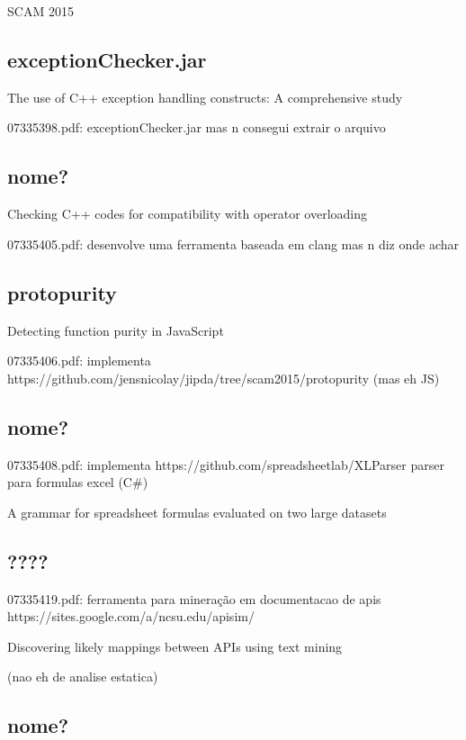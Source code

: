 SCAM 2015

\subsection{exceptionChecker.jar}

The use of C++ exception handling constructs: A comprehensive study

07335398.pdf: exceptionChecker.jar mas n consegui extrair o arquivo

\subsection{nome?}

Checking C++ codes for compatibility with operator overloading

07335405.pdf: desenvolve uma ferramenta baseada em clang mas n diz onde achar

\subsection{protopurity}

Detecting function purity in JavaScript

07335406.pdf: implementa https://github.com/jensnicolay/jipda/tree/scam2015/protopurity (mas eh JS)

\subsection{nome?}

07335408.pdf: implementa https://github.com/spreadsheetlab/XLParser parser para formulas excel (C\#)

A grammar for spreadsheet formulas evaluated on two large datasets

\subsection{????}

07335419.pdf: ferramenta para mineração em documentacao de apis https://sites.google.com/a/ncsu.edu/apisim/

Discovering likely mappings between APIs using text mining

(nao eh de analise estatica)

\subsection{nome?}

